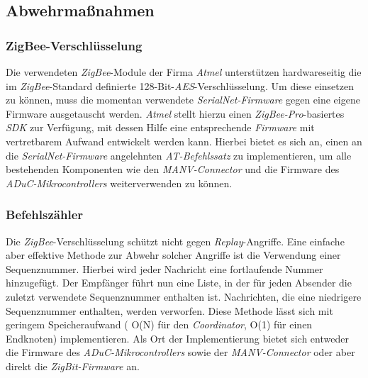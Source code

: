 \subsection{Abwehrmaßnahmen}

\subsubsection{ZigBee-Verschlüsselung}
Die verwendeten \emph{ZigBee}-Module der Firma \emph{Atmel} unterstützen hardwareseitig die im 
\emph{ZigBee}-Standard definierte 128-Bit-\emph{AES}-Verschlüsselung. 
Um diese einsetzen zu können, muss die momentan verwendete \emph{SerialNet-Firmware}
gegen eine eigene Firmware ausgetauscht werden. \emph{Atmel} stellt hierzu einen \emph{ZigBee-Pro}-basiertes 
\emph{SDK} zur Verfügung, mit dessen Hilfe eine entsprechende \emph{Firmware} mit vertretbarem Aufwand entwickelt 
werden kann. Hierbei bietet es sich an, einen an die \emph{SerialNet-Firmware} angelehnten \emph{AT-Befehlssatz} zu 
implementieren, um alle bestehenden Komponenten wie den \emph{MANV-Connector} und die Firmware des 
\emph{ADuC-Mikrocontrollers} weiterverwenden zu können.

\subsubsection{Befehlszähler}
Die \emph{ZigBee}-Verschlüsselung schützt nicht gegen \emph{Replay}-Angriffe. Eine einfache aber effektive Methode 
zur Abwehr solcher
Angriffe ist die Verwendung einer Sequenznummer. Hierbei wird jeder Nachricht eine fortlaufende Nummer hinzugefügt. 
Der Empfänger führt nun eine Liste, in der für jeden Absender die zuletzt verwendete Sequenznummer enthalten ist.
Nachrichten, die eine niedrigere Sequenznummer enthalten, werden verworfen. Diese Methode lässt sich mit geringem
Speicheraufwand ( O(N) für den \emph{Coordinator}, O(1) für einen Endknoten) implementieren. Als Ort der Implementierung
bietet sich entweder die Firmware des \emph{ADuC-Mikrocontrollers} sowie der \emph{MANV-Connector} oder aber direkt 
die \emph{ZigBit-Firmware} an.


